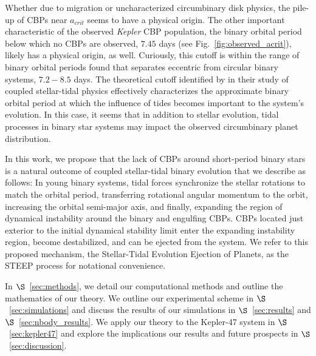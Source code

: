 Whether due to migration or uncharacterized circumbinary disk physics, the pile-up of CBPs near $a_{crit}$ seems to have a physical origin.  The other important characteristic of the observed {\it Kepler} CBP population, the binary orbital period below which no CBPs are observed, $7.45$ days (see Fig.~\ref{fig:observed_acrit}), likely has a physical origin, as well.  Curiously, this cutoff is within the range of binary orbital periods \citet{Zahn1989} found that separates eccentric from circular binary systems, $7.2-8.5$ days.  The theoretical cutoff identified by \citet{Zahn1989} in their study of coupled stellar-tidal physics effectively characterizes the approximate binary orbital period at which the influence of tides becomes important to the system's evolution.  In this case, it seems that in addition to stellar evolution, tidal processes in binary star systems may impact the observed circumbinary planet distribution.

In this work, we propose that the lack of CBPs around short-period binary stars is a natural outcome of coupled stellar-tidal binary evolution that we describe as follows:  In young binary systems, tidal forces synchronize the stellar rotations to match the orbital period, transferring rotational angular momentum to the orbit, increasing the orbital semi-major axis, and finally, expanding the region of dynamical instability around the binary and engulfing CBPs.  CBPs located just exterior to the initial dynamical stability limit enter the expanding instability region, become destabilized, and can be ejected from the system.  We refer to this proposed mechanism, the Stellar-Tidal Evolution Ejection of Planets, as the STEEP process for notational convenience.  

In $\S$~\ref{sec:methods}, we detail our computational methods and outline the mathematics of our theory.  We outline our experimental scheme in $\S$~\ref{sec:simulations} and discuss the results of our simulations in $\S$~\ref{sec:results} and $\S$~\ref{sec:nbody_results}.  We apply our theory to the Kepler-47 system in $\S$~\ref{sec:kepler47} and explore the implications our results and future prospects in $\S$~\ref{sec:discussion}.



